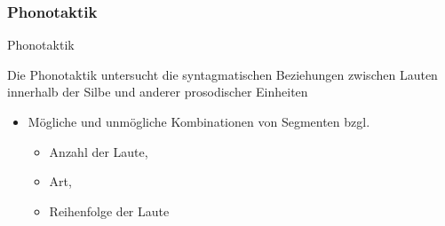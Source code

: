 \begin{frame}
\frametitle{Phonotaktik}

\begin{block}{Phonotaktik}

Die Phonotaktik untersucht die syntagmatischen Beziehungen zwischen Lauten innerhalb der Silbe und anderer prosodischer Einheiten \citep{Fuhrhop&Co13a}

\end{block}

\begin{itemize}
	\item Mögliche und unmögliche Kombinationen von Segmenten bzgl.
	
	\begin{itemize}
		\item Anzahl der Laute,
		\item Art,
		\item Reihenfolge der Laute
	\end{itemize}

\end{itemize}

\end{frame}




